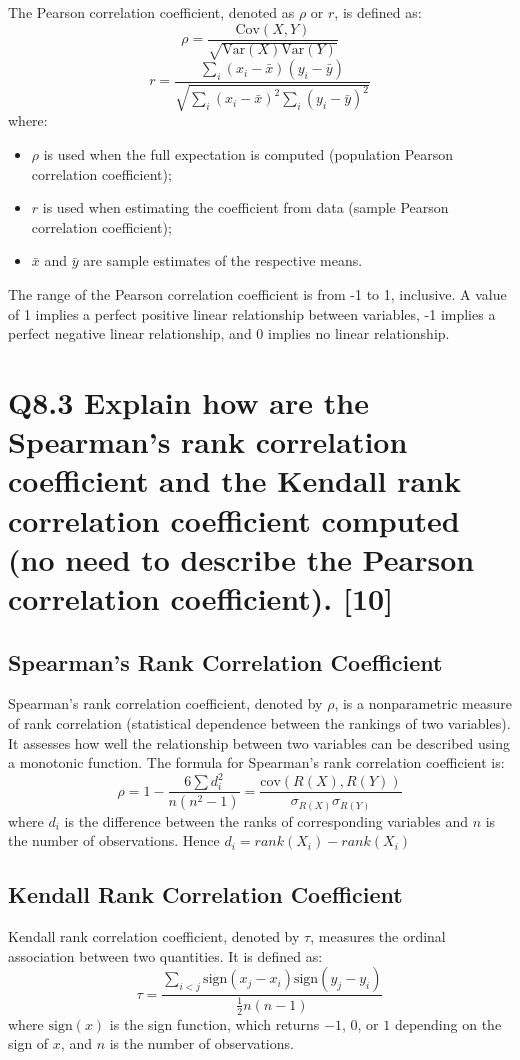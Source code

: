 \documentclass[11pt]{article}
\begin{document}
The Pearson correlation coefficient, denoted as \( \rho \) or \( r \), is defined as:
\[
\rho = \frac{\text{Cov}(X, Y)}{\sqrt{\text{Var}(X)\text{Var}(Y)}}
\]
\[
r = \frac{\sum_{i} (x_i - \bar{x})(y_i - \bar{y})}{\sqrt{\sum_{i} (x_i - \bar{x})^2 \sum_{i} (y_i - \bar{y})^2}}
\]
where:
\begin{itemize}
  \item \( \rho \) is used when the full expectation is computed (population Pearson correlation coefficient);
  \item \( r \) is used when estimating the coefficient from data (sample Pearson correlation coefficient);
  \item \( \bar{x} \) and \( \bar{y} \) are sample estimates of the respective means.
\end{itemize}

The range of the Pearson correlation coefficient is from -1 to 1, inclusive. A value of 1 implies a perfect positive linear relationship between variables, -1 implies a perfect negative linear relationship, and 0 implies no linear relationship.

\section{Q8.3 Explain how are the Spearman's rank correlation coefficient and the Kendall rank correlation coefficient computed (no need to describe the Pearson correlation coefficient). [10]}


\subsection*{Spearman's Rank Correlation Coefficient}
Spearman's rank correlation coefficient, denoted by \(\rho\), is a nonparametric measure of rank correlation (statistical dependence between the rankings of two variables). It assesses how well the relationship between two variables can be described using a monotonic function. The formula for Spearman's rank correlation coefficient is:
\[
\rho = 1 - \frac{6 \sum d_i^2}{n(n^2 - 1)} = \frac{\text{cov}(R(X), R(Y))}{\sigma_{R(X)} \sigma_{R(Y)}}
\]
where \(d_i\) is the difference between the ranks of corresponding variables and \(n\) is the number of observations.
Hence $d_i = rank(X_i) - rank(X_i)$
\subsection*{Kendall Rank Correlation Coefficient}
Kendall rank correlation coefficient, denoted by \(\tau\), measures the ordinal association between two quantities. It is defined as:
\[
\tau = \frac{\sum_{i<j} \text{sign}(x_j - x_i) \text{sign}(y_j - y_i)}{\frac{1}{2} n(n-1)}
\]
where \(\text{sign}(x)\) is the sign function, which returns \(-1\), \(0\), or \(1\) depending on the sign of \(x\), and \(n\) is the number of observations.
\end{document}
